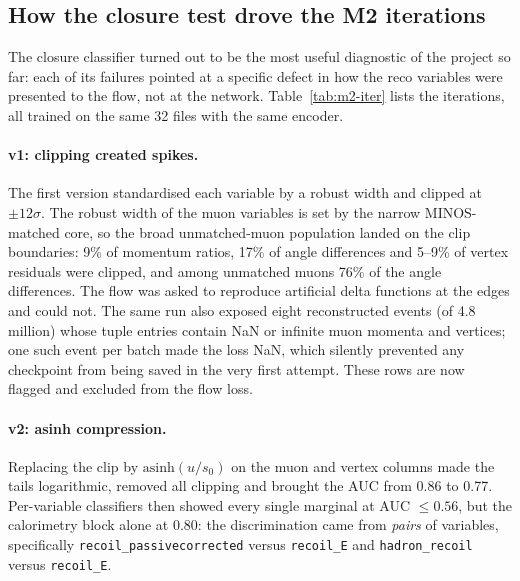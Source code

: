 \subsection{How the closure test drove the M2 iterations}
\label{sec:m2-iter}

The closure classifier turned out to be the most useful diagnostic of the project so far: each of its
failures pointed at a specific defect in how the reco variables were presented to the flow, not at the
network. Table~\ref{tab:m2-iter} lists the iterations, all trained on the same 32 files with the same encoder.

\begin{table}[h]\centering\small
\resizebox{\textwidth}{!}{}
\caption{M2 iterations. $W_1$ values are in the model space of each iteration and are therefore only roughly
comparable across rows; the classifier AUCs are directly comparable.}
\label{tab:m2-iter}
\end{table}

\paragraph{v1: clipping created spikes.} The first version standardised each variable by a robust width and
clipped at $\pm 12\sigma$. The robust width of the muon variables is set by the narrow MINOS-matched core,
so the broad unmatched-muon population landed on the clip boundaries: 9\% of momentum ratios, 17\% of angle
differences and 5--9\% of vertex residuals were clipped, and among unmatched muons 76\% of the angle
differences. The flow was asked to reproduce artificial delta functions at the edges and could not.
The same run also exposed eight reconstructed events (of 4.8 million) whose tuple entries contain NaN or
infinite muon momenta and vertices; one such event per batch made the loss NaN, which silently prevented any
checkpoint from being saved in the very first attempt. These rows are now flagged and excluded from the flow
loss.

\paragraph{v2: asinh compression.} Replacing the clip by $\mathrm{asinh}(u/s_0)$ on the muon and vertex
columns made the tails logarithmic, removed all clipping and brought the AUC from 0.86 to 0.77. Per-variable
classifiers then showed every single marginal at AUC $\le 0.56$, but the calorimetry block alone at 0.80:
the discrimination came from \emph{pairs} of variables, specifically \texttt{recoil\_passivecorrected} versus
\texttt{recoil\_E} and \texttt{hadron\_recoil} versus \texttt{recoil\_E}.

